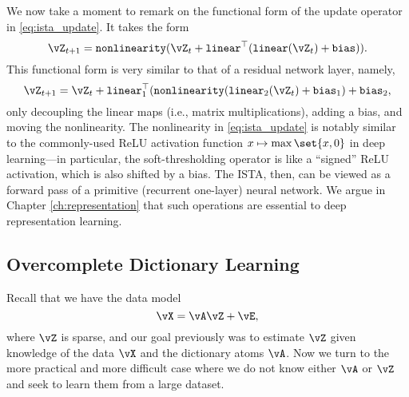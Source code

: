 \documentclass[../../book-main.tex]{subfiles}
\begin{document}
We now take a moment to remark on the functional form of the update operator in \eqref{eq:ista_update}. It takes the form 
\begin{equation}
    \vZ_{t + 1} = \texttt{nonlinearity}(\vZ_{t} + \texttt{linear}^{\top}(\texttt{linear}(\vZ_{t}) + \texttt{bias})).
\end{equation}
This functional form is very similar to that of a residual network layer, namely,
\begin{equation}
    \vZ_{t + 1} = \vZ_{t} + \texttt{linear}_{1}^{\top}(\texttt{nonlinearity}(\texttt{linear}_{2}(\vZ_{t}) + \texttt{bias}_{1}) + \texttt{bias}_{2},
\end{equation}
only decoupling the linear maps (i.e., matrix multiplications), adding a bias, and moving the nonlinearity. 
The nonlinearity in \eqref{eq:ista_update} is notably similar to the
commonly-used ReLU activation function $x \mapsto \max\set{x, 0}$ in deep
learning---in particular, the soft-thresholding operator is like a ``signed''
ReLU activation, which is also shifted by a bias.
The ISTA, then, can be viewed as a forward pass of a primitive (recurrent one-layer) neural network. We argue in Chapter \ref{ch:representation} that such operations are essential to deep representation learning.




\subsection{Overcomplete Dictionary Learning} 

Recall that we have the data model 
\begin{equation}\label{eq:overcomplete-dl-section-data-model}
    \vX = \vA\vZ + \vE,
\end{equation}
where \(\vZ\) is sparse, and our goal previously was to estimate \(\vZ\) given
knowledge of the data \(\vX\) and the dictionary atoms \(\vA\). Now we turn to
the more practical and more difficult case where we do not know
either \(\vA\) or \(\vZ\) and seek to learn them from a large dataset. 
\end{document}
